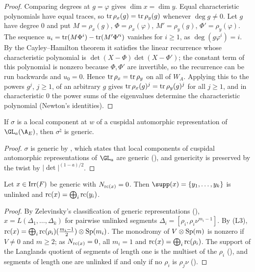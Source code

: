 \begin{proof}
Comparing degrees at $g=\varphi$ gives $\dim x=\dim y$. Equal characteristic polynomials have equal traces, so
$\operatorname{tr}\rho_x(g)=\operatorname{tr}\rho_y(g)$ whenever $\deg g\ne0$. Let $g$ have degree $0$ and put $M=\rho_x(g)$,
$\Phi=\rho_x(\varphi)$, $M'=\rho_y(g)$, $\Phi'=\rho_y(\varphi)$. The sequence
$u_i=\operatorname{tr}(M\Phi^i)-\operatorname{tr}(M'\Phi'^i)$ vanishes for $i\ge1$, as $\deg(g\varphi^i)=i$. By the Cayley--Hamilton
theorem it satisfies the linear recurrence whose characteristic polynomial is $\det(X-\Phi)\det(X-\Phi')$; the
constant term of this polynomial is nonzero because $\Phi,\Phi'$ are invertible, so the recurrence can be run
backwards and $u_0=0$. Hence $\operatorname{tr}\rho_x=\operatorname{tr}\rho_y$ on all of $W_A$. Applying this to the powers $g^j$,
$j\ge1$, of an arbitrary $g$ gives $\operatorname{tr}\rho_x(g)^j=\operatorname{tr}\rho_y(g)^j$ for all $j\ge1$, and in characteristic $0$
the power sums of the eigenvalues determine the characteristic polynomial (Newton's identities).
\end{proof}

\begin{lemma}\label{pf:galred:generic}
If $\sigma$ is a local component at $w$ of a cuspidal automorphic representation of $\GL_a(\A_E)$, then
$\sigma^\natural$ is generic.
\end{lemma}

\begin{proof}
$\sigma$ is generic by , which states that local
components of cuspidal automorphic representations of $\GL_a$ are generic (\cite{Shalika1974}), and genericity
is preserved by the twist by $|\det|^{(1-a)/2}$.
\end{proof}

\begin{lemma}\label{pf:galred:split}
Let $x\in\operatorname{Irr}(F)$ be generic with $N_{\mathrm{rc}(x)}=0$. Then $\supp(x)=\{y_1,\dots,y_k\}$ is unlinked and
$\mathrm{rc}(x)=\bigoplus_i\mathrm{rc}(y_i)$.
\end{lemma}

\begin{proof}
By Zelevinsky's classification of generic representations (\cite[\S9]{Zelevinsky1980}), $x=L(\Delta_1,\dots,\Delta_k)$ for pairwise
unlinked segments $\Delta_i=[\rho_i,\rho_i\nu^{m_i-1}]$. By (L3),
$\mathrm{rc}(x)=\bigoplus_i\mathrm{rc}(\rho_i)(\frac{m_i-1}2)\otimes\operatorname{Sp}(m_i)$. The monodromy of
$V\otimes\operatorname{Sp}(m)$ is nonzero if $V\ne0$ and $m\ge2$; as $N_{\mathrm{rc}(x)}=0$, all $m_i=1$ and
$\mathrm{rc}(x)=\bigoplus_i\mathrm{rc}(\rho_i)$. The support of
the Langlands quotient of segments of length one is the multiset of the $\rho_i$
(), and segments of length one are
unlinked if and only if no $\rho_i$ is $\rho_j\nu$
().
\end{proof}

